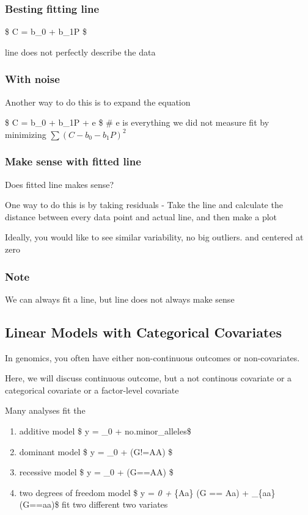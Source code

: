 \documentclass[]{article}
\providecommand{\tightlist}{%
  \setlength{\itemsep}{0pt}\setlength{\parskip}{0pt}}
\begin{document}
\subsubsection{Besting fitting line}\label{besting-fitting-line}

\$ C = b\_0 + b\_1P \$

line does not perfectly describe the data

\subsubsection{With noise}\label{with-noise}

Another way to do this is to expand the equation

\$ C = b\_0 + b\_1P + e \$ \# e is everything we did not measure fit by
minimizing \(\sum(C-b_0-b_1P)^2\)

\subsubsection{Make sense with fitted
line}\label{make-sense-with-fitted-line}

Does fitted line makes sense?

One way to do this is by taking residuals - Take the line and calculate
the distance between every data point and actual line, and then make a
plot

Ideally, you would like to see similar variability, no big outliers. and
centered at zero

\subsubsection{Note}\label{note}

We can always fit a line, but line does not always make sense

\subsection{Linear Models with Categorical
Covariates}\label{linear-models-with-categorical-covariates}

In genomics, you often have either non-continuous outcomes or
non-covariates.

Here, we will discuss continuous outcome, but a not continous covariate
or a categorical covariate or a factor-level covariate

Many analyses fit the

\begin{enumerate}
\def\labelenumi{\arabic{enumi})}
\tightlist
\item
  additive model \$ y = \beta\_0 + \beta \times no.minor\_alleles\$
\item
  dominant model \$ y = \beta\_0 + \beta \times (G!=AA) \$
\item
  recessive model \$ y = \beta\_0 + \beta \times (G==AA) \$
\item
  two degrees of freedom model \$ y = \beta\emph{0 + \beta}\{Aa\}
  \times (G == Aa) + \beta\_\{aa\} \times (G==aa)\$ fit two different
  two variates
\end{enumerate}
\end{document}

